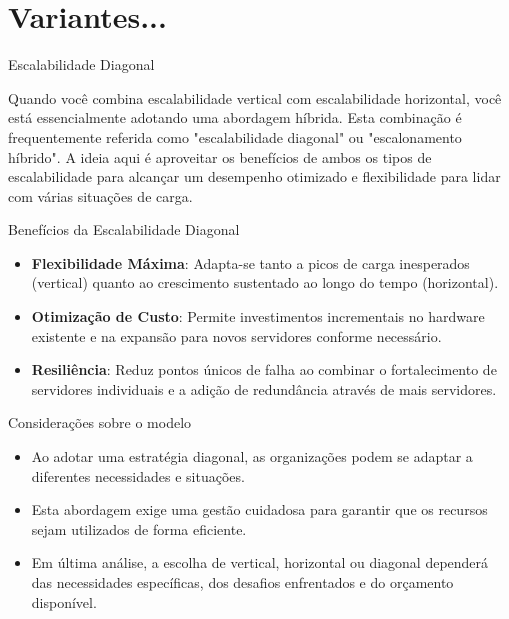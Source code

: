 \documentclass{beamer}
\begin{document}
    \section{Variantes...}

    \begin{frame}{Escalabilidade Diagonal}\justifying

        Quando você combina escalabilidade vertical com escalabilidade horizontal, você está essencialmente adotando uma abordagem híbrida.
        Esta combinação é frequentemente referida como "escalabilidade diagonal" ou "escalonamento híbrido". A ideia aqui é aproveitar os benefícios de ambos os tipos de escalabilidade para alcançar um desempenho otimizado e flexibilidade para lidar com várias situações de carga.
        
        \end{frame}
        

    \begin{frame}{Benefícios da Escalabilidade Diagonal}

        \begin{itemize}
            \item \textbf{Flexibilidade Máxima}: Adapta-se tanto a picos de carga inesperados (vertical) quanto ao crescimento sustentado ao longo do tempo (horizontal).
            \item \textbf{Otimização de Custo}: Permite investimentos incrementais no hardware existente e na expansão para novos servidores conforme necessário.
            \item \textbf{Resiliência}: Reduz pontos únicos de falha ao combinar o fortalecimento de servidores individuais e a adição de redundância através de mais servidores.
        \end{itemize}
        
        \end{frame}
        \begin{frame}{Considerações sobre o modelo}

            \begin{itemize}
                \item Ao adotar uma estratégia diagonal, as organizações podem se adaptar a diferentes necessidades e situações.
                \item Esta abordagem exige uma gestão cuidadosa para garantir que os recursos sejam utilizados de forma eficiente.
                \item Em última análise, a escolha de vertical, horizontal ou diagonal dependerá das necessidades específicas, dos desafios enfrentados e do orçamento disponível.
            \end{itemize}
            
            \end{frame}
                    
\end{document}

